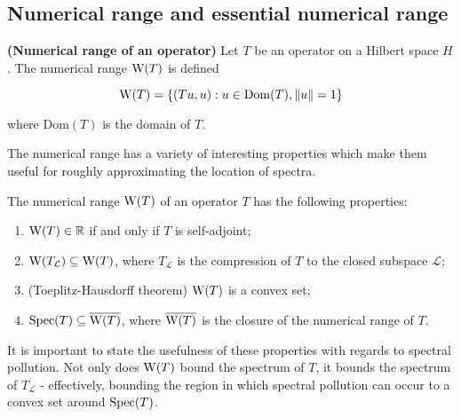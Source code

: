 \documentclass[../main.tex]{subfiles}
\begin{document}
\subsection{Numerical range and essential numerical range}
\begin{definition}{\textbf{(Numerical range of an operator)}} Let $T$ be an operator on a Hilbert space $H$. The
numerical range $\mathrm{W}(T)$ is defined

$$\mathrm{W}(T) = \{( Tu, u ) : u \in \mathrm{Dom}(T), \|u\|=1\}$$

where $\text{Dom}(T)$ is the domain of $T$.
\end{definition}

The numerical range has a variety of interesting properties which make them useful for roughly approximating
the location of spectra.

\begin{proposition}\label{thm:num-range-props}
The numerical range $\mathrm{W}(T)$ of an operator $T$ has the following properties:
\begin{enumerate}
\item\label{item:num-in-R} $\mathrm{W}(T) \in \mathbb{R}$ if and only if $T$ is self-adjoint;
\item\label{item:proj-num-range} $\mathrm{W}(T_\mathcal{L}) \subseteq \mathrm{W}(T)$, where $T_\mathcal{L}$ is the compression of $T$ to the closed subspace $\mathcal{L}$;
\item (Toeplitz-Hausdorff theorem)\label{item:toeplitz-hausdorff} $\mathrm{W}(T)$ is a convex set;
\item\label{item:spec-in-num} $\mathrm{Spec}(T) \subseteq \overline{\mathrm{W}(T)}$, where $\overline{\mathrm{W}(T)}$ is the closure of the numerical range of $T$.
\end{enumerate}
\end{proposition}

It is important to state the usefulness of these properties with regards to spectral pollution. Not only does $\mathrm{W}(T)$ bound the spectrum of $T$,
it bounds the spectrum of $T_\mathcal{L}$ - effectively, bounding the region in which spectral pollution can occur to a convex set around $\mathrm{Spec}(T)$.
\end{document}
